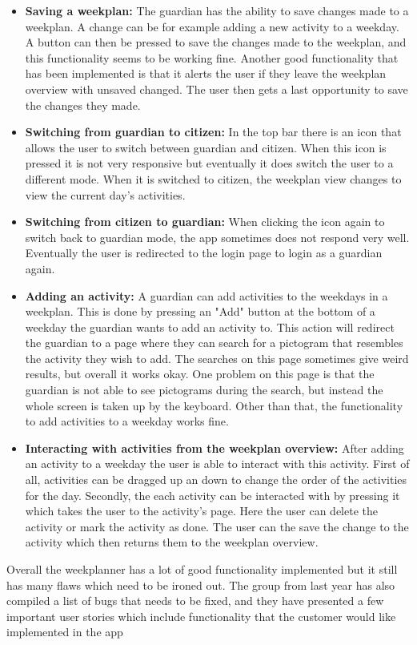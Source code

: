 \begin{itemize}
    \\
    \item \textbf{Saving a weekplan:} The guardian has the ability to save changes made to a weekplan. A change can be for example adding a new activity to a weekday.
    A button can then be pressed to save the changes made to the weekplan, and this functionality seems to be working fine.
    Another good functionality that has been implemented is that it alerts the user if they leave the weekplan overview with unsaved changed. The user then gets a last opportunity to save the changes they made.
    \\
    \item \textbf{Switching from guardian to citizen:} In the top bar there is an icon that allows the user to switch between guardian and citizen. 
    When this icon is pressed it is not very responsive but eventually it does switch the user to a different mode. 
    When it is switched to citizen, the weekplan view changes to view the current day's activities.
    \\
    \item \textbf{Switching from citizen to guardian:} When clicking the icon again to switch back to guardian mode, the app sometimes does not respond very well. 
    Eventually the user is redirected to the login page to login as a guardian again.
    \\
    \item \textbf{Adding an activity:} A guardian can add activities to the weekdays in a weekplan. This is done by pressing an "Add" button at the bottom of a weekday the guardian wants to add an activity to.
    This action will redirect the guardian to a page where they can search for a pictogram that resembles the activity they wish to add. The searches on this page sometimes give weird results, but overall it works okay.
    One problem on this page is that the guardian is not able to see pictograms during the search, but instead the whole screen is taken up by the keyboard. 
    Other than that, the functionality to add activities to a weekday works fine.
    \\
    \item \textbf{Interacting with activities from the weekplan overview:} After adding an activity to a weekday the user is able to interact with this activity. 
    First of all, activities can be dragged up an down to change the order of the activities for the day. 
    Secondly, the each activity can be interacted with by pressing it which takes the user to the activity's page. 
    Here the user can delete the activity or mark the activity as done. The user can the save the change to the activity which then returns them to the weekplan overview.
    \\
\end{itemize}
Overall the weekplanner has a lot of good functionality implemented but it still has many flaws which need to be ironed out. 
The group from last year has also compiled a list of bugs that needs to be fixed, and they have presented a few important user stories which include functionality that the customer would like implemented in the app